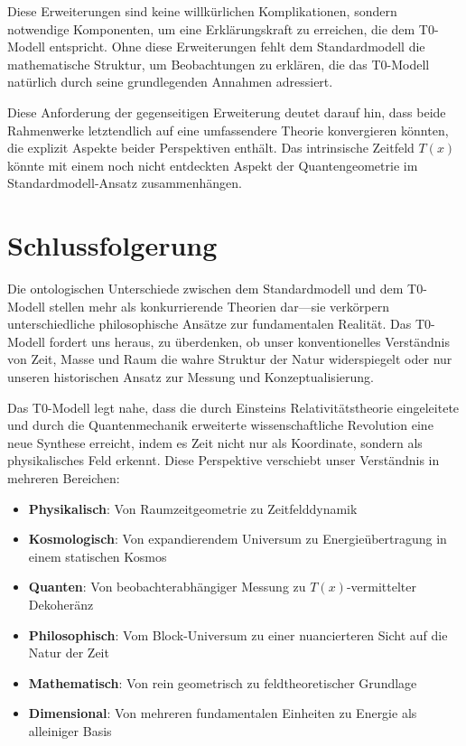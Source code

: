 \documentclass[12pt,a4paper]{article}
\newcommand{\Tfield}{T(x)}
\begin{document}
	Diese Erweiterungen sind keine willkürlichen Komplikationen, sondern notwendige Komponenten, um eine Erklärungskraft zu erreichen, die dem T0-Modell entspricht. Ohne diese Erweiterungen fehlt dem Standardmodell die mathematische Struktur, um Beobachtungen zu erklären, die das T0-Modell natürlich durch seine grundlegenden Annahmen adressiert.
	
	Diese Anforderung der gegenseitigen Erweiterung deutet darauf hin, dass beide Rahmenwerke letztendlich auf eine umfassendere Theorie konvergieren könnten, die explizit Aspekte beider Perspektiven enthält. Das intrinsische Zeitfeld $\Tfield$ könnte mit einem noch nicht entdeckten Aspekt der Quantengeometrie im Standardmodell-Ansatz zusammenhängen.
	
	\section{Schlussfolgerung}
	
	Die ontologischen Unterschiede zwischen dem Standardmodell und dem T0-Modell stellen mehr als konkurrierende Theorien dar—sie verkörpern unterschiedliche philosophische Ansätze zur fundamentalen Realität. Das T0-Modell fordert uns heraus, zu überdenken, ob unser konventionelles Verständnis von Zeit, Masse und Raum die wahre Struktur der Natur widerspiegelt oder nur unseren historischen Ansatz zur Messung und Konzeptualisierung.
	
	Das T0-Modell legt nahe, dass die durch Einsteins Relativitätstheorie eingeleitete und durch die Quantenmechanik erweiterte wissenschaftliche Revolution eine neue Synthese erreicht, indem es Zeit nicht nur als Koordinate, sondern als physikalisches Feld erkennt. Diese Perspektive verschiebt unser Verständnis in mehreren Bereichen:
	
	\begin{itemize}
		\item \textbf{Physikalisch}: Von Raumzeitgeometrie zu Zeitfelddynamik
		\item \textbf{Kosmologisch}: Von expandierendem Universum zu Energieübertragung in einem statischen Kosmos
		\item \textbf{Quanten}: Von beobachterabhängiger Messung zu $\Tfield$-vermittelter Dekoheränz
		\item \textbf{Philosophisch}: Vom Block-Universum zu einer nuancierteren Sicht auf die Natur der Zeit
		\item \textbf{Mathematisch}: Von rein geometrisch zu feldtheoretischer Grundlage
		\item \textbf{Dimensional}: Von mehreren fundamentalen Einheiten zu Energie als alleiniger Basis
	\end{itemize}
	
\end{document}
